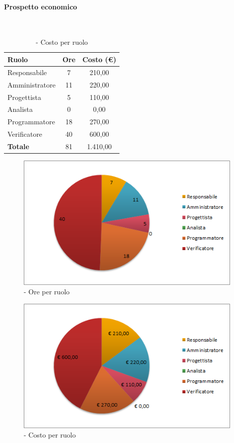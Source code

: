 \documentclass[../PianoDiProgetto.tex]{subfiles}
\begin{document}
\vfill
	\paragraph{Prospetto economico}\
					
	\begin{table}[H]
		\centering
	
		\begin{tabular}{l * {2}{c}}
			\toprule
			\textbf{Ruolo} & \textbf{Ore} & \textbf{Costo (\euro{})} \\
			\midrule
			Responsabile & 7 & 210,00 \\
			Amministratore  & 11 & 220,00 \\
			Progettista  & 5 & 110,00 \\
			Analista & 0 & 0,00 \\
			Programmatore  & 18 &  270,00 \\
			Verificatore  & 40 &  600,00 \\
			\midrule
			\textbf{Totale}  & 81   &  1.410,00 \\
			\bottomrule	
		\end{tabular}
		\caption{\PerV{} - Costo per ruolo}
	\end{table}
\vfill	
	
	\begin{figure}[H]
		\centering
		\includegraphics[width=11cm, trim=1cm 0cm 1cm 0cm]{grafici/V-ruolo}
			\caption{\PerV{} - Ore per ruolo}
	\end{figure}
\vfill	
\newpage
	\begin{figure}[H]
		\centering
		\includegraphics[width=11cm, trim=1cm 0cm 1cm 0cm]{grafici/V-costo}
			\caption{\PerV{} - Costo per ruolo}
	\end{figure}	
	
\end{document}
